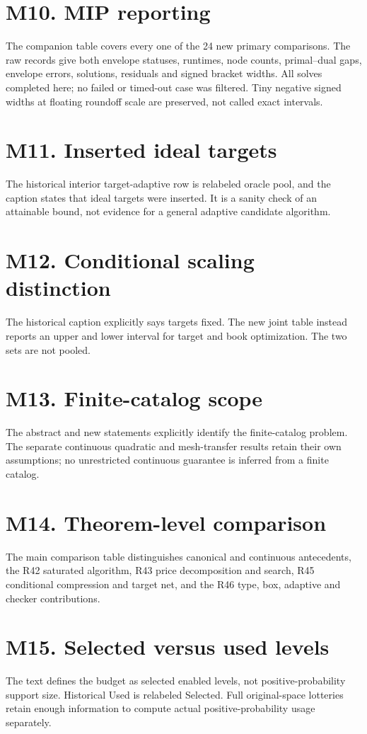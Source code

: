 \documentclass[11pt,letterpaper]{article}
\begin{document}
\section*{M10. MIP reporting}
The companion table covers every one of the 24 new primary comparisons. The raw records give both envelope statuses, runtimes, node counts, primal--dual gaps, envelope errors, solutions, residuals and signed bracket widths. All solves completed here; no failed or timed-out case was filtered. Tiny negative signed widths at floating roundoff scale are preserved, not called exact intervals.

\section*{M11. Inserted ideal targets}
The historical interior target-adaptive row is relabeled oracle pool, and the caption states that ideal targets were inserted. It is a sanity check of an attainable bound, not evidence for a general adaptive candidate algorithm.

\section*{M12. Conditional scaling distinction}
The historical caption explicitly says targets fixed. The new joint table instead reports an upper and lower interval for target and book optimization. The two sets are not pooled.

\section*{M13. Finite-catalog scope}
The abstract and new statements explicitly identify the finite-catalog problem. The separate continuous quadratic and mesh-transfer results retain their own assumptions; no unrestricted continuous guarantee is inferred from a finite catalog.

\section*{M14. Theorem-level comparison}
The main comparison table distinguishes canonical and continuous antecedents, the R42 saturated algorithm, R43 price decomposition and search, R45 conditional compression and target net, and the R46 type, box, adaptive and checker contributions.

\section*{M15. Selected versus used levels}
The text defines the budget as selected enabled levels, not positive-probability support size. Historical Used is relabeled Selected. Full original-space lotteries retain enough information to compute actual positive-probability usage separately.
\end{document}
